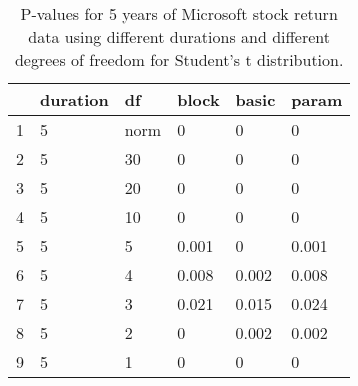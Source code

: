 \begin{table}[ht]
\centering
\caption{P-values for 5 years of Microsoft stock return 
                   data using different durations
  and different degrees of freedom for Student's t distribution.} 
\label{table:microsoft5}
\begin{tabular}{rlllll}
  \hline
 & duration & df & block & basic & param \\ 
  \hline
1 & 5 & norm & 0 & 0 & 0 \\ 
  2 & 5 & 30 & 0 & 0 & 0 \\ 
  3 & 5 & 20 & 0 & 0 & 0 \\ 
  4 & 5 & 10 & 0 & 0 & 0 \\ 
  5 & 5 & 5 & 0.001 & 0 & 0.001 \\ 
  6 & 5 & 4 & 0.008 & 0.002 & 0.008 \\ 
  7 & 5 & 3 & 0.021 & 0.015 & 0.024 \\ 
  8 & 5 & 2 & 0 & 0.002 & 0.002 \\ 
  9 & 5 & 1 & 0 & 0 & 0 \\ 
   \hline
\end{tabular}
\end{table}


